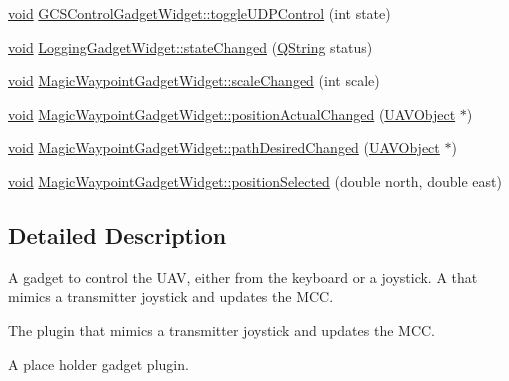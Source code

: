 \begin{DoxyCompactItemize}
\item 
\hyperlink{group___u_a_v_objects_plugin_ga444cf2ff3f0ecbe028adce838d373f5c}{void} \hyperlink{group___g_c_s_control_gadget_plugin_gaaaa6db9417f6f94567e477ed6b5bd099}{\-G\-C\-S\-Control\-Gadget\-Widget\-::toggle\-U\-D\-P\-Control} (int state)
\item 
\hyperlink{group___u_a_v_objects_plugin_ga444cf2ff3f0ecbe028adce838d373f5c}{void} \hyperlink{group___g_c_s_control_gadget_plugin_ga8d9370f949bfe6eec4f37676feb6de85}{\-Logging\-Gadget\-Widget\-::state\-Changed} (\hyperlink{group___u_a_v_objects_plugin_gab9d252f49c333c94a72f97ce3105a32d}{\-Q\-String} status)
\item 
\hyperlink{group___u_a_v_objects_plugin_ga444cf2ff3f0ecbe028adce838d373f5c}{void} \hyperlink{group___g_c_s_control_gadget_plugin_ga9cebbe1d3a653c8385f5fdc70345efd6}{\-Magic\-Waypoint\-Gadget\-Widget\-::scale\-Changed} (int scale)
\item 
\hyperlink{group___u_a_v_objects_plugin_ga444cf2ff3f0ecbe028adce838d373f5c}{void} \hyperlink{group___g_c_s_control_gadget_plugin_gaa10cdac61400db1034c7954b3c549824}{\-Magic\-Waypoint\-Gadget\-Widget\-::position\-Actual\-Changed} (\hyperlink{class_u_a_v_object}{\-U\-A\-V\-Object} $\ast$)
\item 
\hyperlink{group___u_a_v_objects_plugin_ga444cf2ff3f0ecbe028adce838d373f5c}{void} \hyperlink{group___g_c_s_control_gadget_plugin_ga3270e904f313cabdad8a5048009ceb25}{\-Magic\-Waypoint\-Gadget\-Widget\-::path\-Desired\-Changed} (\hyperlink{class_u_a_v_object}{\-U\-A\-V\-Object} $\ast$)
\item 
\hyperlink{group___u_a_v_objects_plugin_ga444cf2ff3f0ecbe028adce838d373f5c}{void} \hyperlink{group___g_c_s_control_gadget_plugin_ga8735baaf13101dbe0dafb3dc84d83efd}{\-Magic\-Waypoint\-Gadget\-Widget\-::position\-Selected} (double north, double east)
\end{DoxyCompactItemize}


\subsection{\-Detailed \-Description}
\-A gadget to control the \-U\-A\-V, either from the keyboard or a joystick. \-A that mimics a transmitter joystick and updates the \-M\-C\-C.

\-The plugin that mimics a transmitter joystick and updates the \-M\-C\-C.

\-A place holder gadget plugin. 

